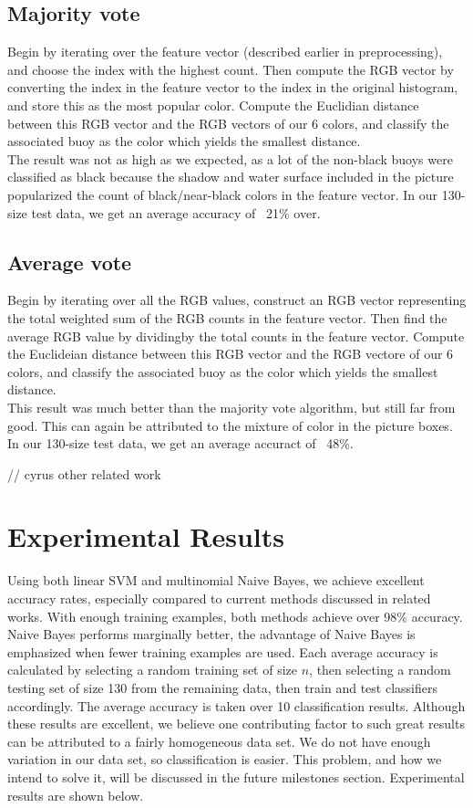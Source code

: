 \documentclass{article} %
\begin{document}
\subsection{Majority vote}
Begin by iterating over the feature vector (described earlier in preprocessing), and choose the index with the highest count. Then compute the RGB vector by converting the index in the feature vector to the index in the original histogram, and store this as the most popular color. Compute the Euclidian distance between this RGB vector and the RGB vectors of our 6 colors, and classify the associated buoy as the color which yields the smallest distance.\\
The result was not as high as we expected, as a lot of the non-black buoys were classified as black because the shadow and water surface included in the picture popularized the count of black/near-black colors in the feature vector. In our 130-size test data, we get an average accuracy of ~21\% over.

\subsection{Average vote}
Begin by iterating over all the RGB values, construct an RGB vector representing the total weighted sum of the RGB counts in the feature vector. Then find the average RGB value by dividingby the total counts in the feature vector. Compute the Euclideian distance between this RGB vector and the RGB vectore of our 6 colors, and classify the associated buoy as the color which yields the smallest distance.\\
This result was much better than the majority vote algorithm, but still far from good. This can again be attributed to the mixture of color in the picture boxes. In our 130-size test data, we get an average accuract of ~48\%.

// cyrus other related work

\section{Experimental Results}
Using both linear SVM and multinomial Naive Bayes, we achieve excellent accuracy rates, especially compared to current methods discussed in related works. With enough training examples, both methods achieve over 98\% accuracy. Naive Bayes performs marginally better, the advantage of Naive Bayes is emphasized when fewer training examples are used. Each average accuracy is calculated by selecting a random training set of size $n$, then selecting a random testing set of size 130 from the remaining data, then train and test classifiers accordingly. The average accuracy is taken over 10 classification results. Although these results are excellent, we believe one contributing factor to such great results can be attributed to a fairly homogeneous data set. We do not have enough variation in our data set, so classification is easier. This problem, and how we intend to solve it, will be discussed in the future milestones section. Experimental results are shown below.
\end{document}
